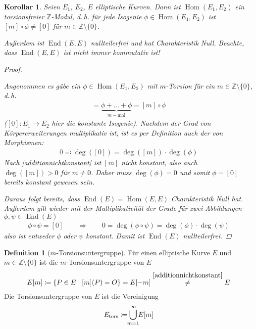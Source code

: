 \documentclass[english, german, parskip=half]{scrartcl}
\newtheorem{Korollar}[Satz]{Korollar}
\theoremstyle{definition}
\newtheorem{Definition}[Satz]{Definition}
\theoremstyle{remark}
\newcommand*{\Z}{\mathds{Z}}
\renewcommand{\O}{O}
\DeclareMathOperator{\Hom}{Hom} %
\DeclareMathOperator{\End}{End} %
\begin{document}
\begin{Korollar}
  Seien $E_1$, $E_2$, $E$ elliptische Kurven. Dann ist $\Hom(E_1,E_2)$
  ein torsionsfreier $\Z$-Modul, d.\,h. für jede Isogenie
  $\phi\in\Hom(E_1,E_2)$ ist $[m]\circ\phi\neq[0]$ für
  $m\in\Z\setminus\{0\}$.

  Außerdem ist $\End(E,E)$ nullteilerfrei und hat Charakteristik Null.
  Beachte, dass $\End(E,E)$ ist nicht immer kommutativ ist!
  \begin{proof}
    \cite[siehe][Proposition 4.2 (b)]{silverman}
    
    Angenommen es gäbe ein $\phi\in\Hom(E_1,E_2)$ mit $m$-Torsion für
    ein $m\in\Z\setminus\{0\}$, d.\,h. 
    \begin{gather*}
      [0]
      =\underbrace{\phi+\dotsc+\phi}_{m-\text{mal}}
      = [m]\circ\phi
    \end{gather*}
    ($[0]\colon E_1\to E_2$ hier die konstante Isogenie).
    Nachdem der Grad von Körpererweiterungen multiplikativ ist, ist es
    per Definition auch der von Morphismen:
    \begin{gather*}
      0 \eqqcolon \deg([0]) = \deg([m])\cdot\deg(\phi)
    \end{gather*}
    Nach \autoref{additionnichtkonstant} ist $[m]$ nicht konstant,
    also auch $\deg([m])>0$ für $m\neq0$. Daher muss $\deg(\phi)=0$
    und somit $\phi=[0]$ bereits konstant gewesen sein.

    Daraus folgt bereits, dass $\End(E)=\Hom(E,E)$ Charakteristik Null hat.
    Außerdem gilt wieder mit der Multiplikativität der Grade für zwei
    Abbildungen $\phi,\psi\in\End(E)$
    \begin{gather*}
      \phi\circ\psi=[0]
      \qquad\Longrightarrow\qquad
      0 = \deg(\phi\circ\psi) = \deg(\phi)\cdot\deg(\psi)
    \end{gather*}
    also ist entweder $\phi$ oder $\psi$ konstant.
    Damit ist $\End(E)$ nullteilerfrei.
  \end{proof}
\end{Korollar}

\begin{Definition}[$m$-Torsionsuntergruppe]
  Für einen elliptische Kurve $E$ und $m\in{\Z\setminus\{0\}}$ ist die
  $m$-Torsionsuntergruppe von $E$
  \begin{gather*}
    E[m] \coloneqq \left\{ P\in E\;\middle|\; [m](P)=\O\right\}
    = E[-m]
    \overset{\autoref{additionnichtkonstant}}{\neq}E
  \end{gather*}
  Die Torsionsuntergruppe von $E$ ist die Vereinigung
  \begin{gather*}
    E_\text{tors} \coloneqq \bigcup_{\mathclap{m=1}}^{\infty}E[m]
  \end{gather*}
\end{Definition}
\end{document}
